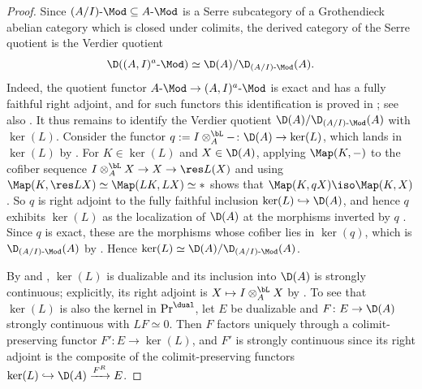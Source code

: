 	\begin{proof}
		Since $(A/I)\text{-}\Mod \subseteq A\text{-}\Mod$ is a Serre subcategory of a Grothendieck abelian category which is closed under colimits, the derived category of the Serre quotient is the Verdier quotient
		\[
			\D((A,I)^a\text{-}\Mod) \simeq \D(A)/\D_{(A/I)\text{-}\Mod}(A).
		\]
		Indeed, the quotient functor $A\text{-}\Mod \to (A,I)^a\text{-}\Mod$ is exact and has a fully faithful right adjoint, and for such functors this identification is proved in \cite[Section~7.7]{Krause_Localization}; see also \cite[Example~2.26]{Efimov_Large_Categories}. It thus remains to identify the Verdier quotient $\D(A)/\D_{(A/I)\text{-}\Mod}(A)$ with $\ker(L)$. Consider the functor $q := I \otimes^{\bL}_A -\colon \D(A) \to \ker(L)$, which lands in $\ker(L)$ by . For $K \in \ker(L)$ and $X \in \D(A)$, applying $\Map(K,-)$ to the cofiber sequence $I \otimes^{\bL}_A X \to X \to \res L(X)$ and using $\Map(K,\res L X) \simeq \Map(LK,LX) \simeq *$ shows that $\Map(K,qX) \iso \Map(K,X)$. So $q$ is right adjoint to the fully faithful inclusion $\ker(L) \hookrightarrow \D(A)$, and hence $q$ exhibits $\ker(L)$ as the localization of $\D(A)$ at the morphisms inverted by $q$ \cite[Proposition~5.2.7.12]{lurie2009HTT}. Since $q$ is exact, these are the morphisms whose cofiber lies in $\ker(q)$, which is $\D_{(A/I)\text{-}\Mod}(A)$ by . Hence $\ker(L) \simeq \D(A)/\D_{(A/I)\text{-}\Mod}(A)$.

		By  and , $\ker(L)$ is dualizable and its inclusion into $\D(A)$ is strongly continuous; explicitly, its right adjoint is $X \mapsto I \otimes^{\bL}_A X$ by . To see that $\ker(L)$ is also the kernel in $\Pr^{\dual}$, let $E$ be dualizable and $F\colon E \to \D(A)$ strongly continuous with $LF \simeq 0$. Then $F$ factors uniquely through a colimit-preserving functor $F'\colon E \to \ker(L)$, and $F'$ is strongly continuous since its right adjoint is the composite of the colimit-preserving functors $\ker(L) \hookrightarrow \D(A) \xrightarrow{F^R} E$.
	\end{proof}


